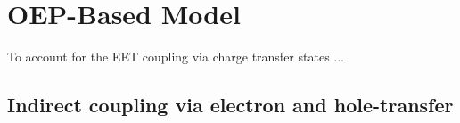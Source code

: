 \section{\label{s:2}OEP-Based Model}





To account for the EET coupling via charge transfer states ...

\subsection{\label{s:2.1}Indirect coupling via electron and hole-transfer}

